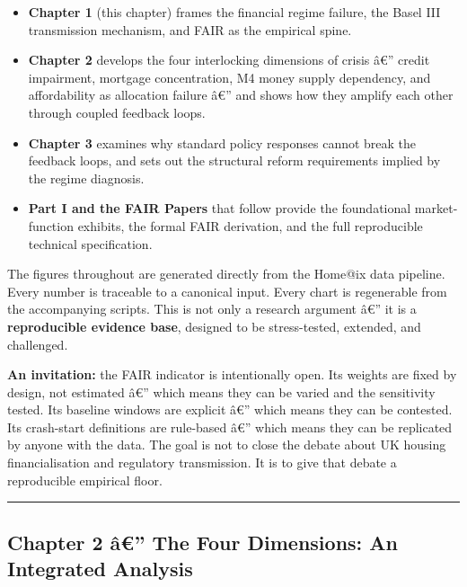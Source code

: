 \begin{itemize}
\tightlist
\item
  \textbf{Chapter 1} (this chapter) frames the financial regime failure,
  the Basel III transmission mechanism, and FAIR as the empirical spine.
\item
  \textbf{Chapter 2} develops the four interlocking dimensions of crisis
  â€'' credit impairment, mortgage concentration, M4 money supply
  dependency, and affordability as allocation failure â€'' and shows how
  they amplify each other through coupled feedback loops.
\item
  \textbf{Chapter 3} examines why standard policy responses cannot break
  the feedback loops, and sets out the structural reform requirements
  implied by the regime diagnosis.
\item
  \textbf{Part I and the FAIR Papers} that follow provide the
  foundational market-function exhibits, the formal FAIR derivation, and
  the full reproducible technical specification.
\end{itemize}

The figures throughout are generated directly from the Home@ix data
pipeline. Every number is traceable to a canonical input. Every chart is
regenerable from the accompanying scripts. This is not only a research
argument â€'' it is a \textbf{reproducible evidence base}, designed to
be stress-tested, extended, and challenged.

\textbf{An invitation:} the FAIR indicator is intentionally open. Its
weights are fixed by design, not estimated â€'' which means they can be
varied and the sensitivity tested. Its baseline windows are explicit
â€'' which means they can be contested. Its crash-start definitions are
rule-based â€'' which means they can be replicated by anyone with the
data. The goal is not to close the debate about UK housing
financialisation and regulatory transmission. It is to give that debate
a reproducible empirical floor.

\begin{center}\rule{0.5\linewidth}{0.5pt}\end{center}

\protect{}\label{chapter-2}
\subsection{Chapter 2 â€'' The Four Dimensions: An Integrated
Analysis}\label{chapter-2-uxe2-the-four-dimensions-an-integrated-analysis}

